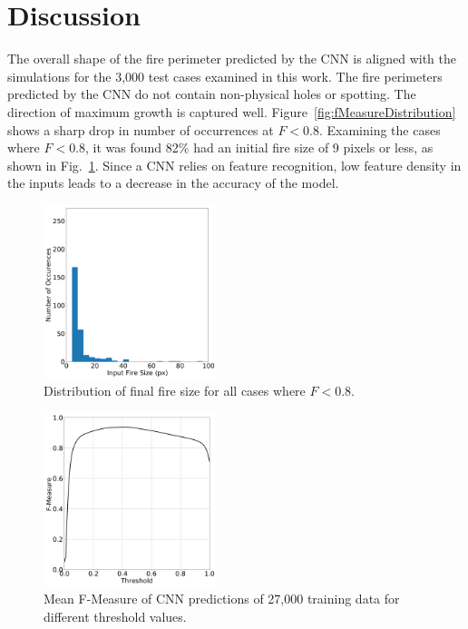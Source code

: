 \documentclass[twocolumn]{svjour3}          %
\begin{document}
\section{Discussion}
\label{s:Discussion}

The overall shape of the fire perimeter predicted by the CNN is aligned
with the simulations for the 3,000 test cases examined in this work.
The fire perimeters predicted by the CNN do not contain non-physical
holes or spotting. The direction of maximum growth is captured well.
Figure~\ref{fig:fMeasureDistribution} shows a sharp drop in number of
occurrences at $F < 0.8$. Examining the cases where $F < 0.8$, it
was found 82\% had an initial fire size of 9 pixels or less, as
shown in Fig.~\ref{fig:fireSize}. Since a CNN relies on feature
recognition, low feature density in the inputs leads to a decrease in
the accuracy of the model.

\begin{figure}[tbp]
\centering
  \includegraphics[width=0.45\textwidth]{rothermelFull_cnnModel3_fireSize_when_F_lt_080.png}
\caption{Distribution of final fire size for all cases where $F < 0.8$.}
\label{fig:fireSize}       %
\end{figure}

\begin{figure}[tbp]
\centering
  \includegraphics[width=0.45\textwidth]{optimalThreshold.png}
\caption{Mean F-Measure of CNN predictions of 27,000 training data for different threshold values.}
\label{fig:fMeasureVsThreshold}       %
\end{figure}
\end{document}
